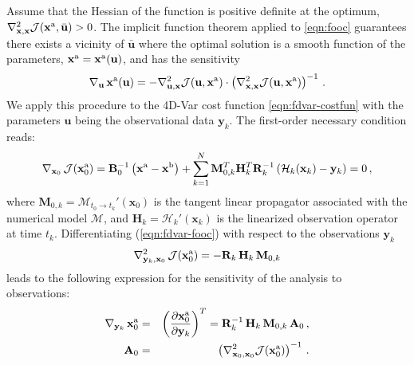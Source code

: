 \documentclass[final,sort&compress]{elsarticle}
\newcommand{\Jfunc}{\mathcal J }
\newcommand{\Model}{\mathcal M}
\newcommand{\M}{\mathbf{M}}
\newcommand{\Hobs}{\mathcal{H}}
\newcommand{\HH}{\mathbf H}
\newcommand{\A}{\mathbf{A}}
\newcommand{\B}{\mathbf{B}}
\newcommand{\R}{\mathbf{R}}
\newcommand{\x}{   \mathbf{x} }
\newcommand{\xb}{ \mathbf{x}^{\rm b} }
\newcommand{\xa}{ \mathbf{x}^{\rm a} }
\newcommand{\y}{ \mathbf{y} }
\renewcommand{\u}{ \mathbf{u} }
\begin{document}
Assume that the Hessian of the function is positive definite at the optimum, $\nabla_{\x,\x}^2 \Jfunc(\xa,\bar{\u})>0$.
The implicit function theorem applied to \eqref{eqn:fooc} guarantees there exists a vicinity of $\bar{\u}$ where the optimal solution is a smooth function
of the parameters, $\xa = \xa(\u)$, and has the sensitivity
\[
 \nabla_\u\, \xa(\u) = -\nabla_{\u,\x}^2 \Jfunc (\u, \xa) \cdot \left(\nabla_{\x,\x}^2 \Jfunc(\u, \xa)\right) ^{-1}\,. 
\]
We apply this procedure to the 4D-Var cost function \eqref{eqn:fdvar-costfun} with the parameters $\u$ being the observational data $\y_k$. The first-order necessary condition reads:
\begin{eqnarray}
\nabla_{\x_0}\, \Jfunc(\xa_0) = \B_0^{-1} \left(\xa - \xb\right) + \sum_{k=1}^{N}  \M_{0,k}^T \HH_k^T \R_k^{-1} \left( \Hobs_k(\x_k) - \y_k \right) = 0 \,,
\label{eqn:fdvar-fooc}
\end{eqnarray}
where $\M_{0,k} = \Model_{t_0 \rightarrow t_k}'(\x_0)$ is the tangent linear propagator associated with the 
numerical model $\Model$, and $\HH_k=\Hobs_k'(\x_k)$ is the linearized observation operator at time $t_k$. 
Differentiating (\ref{eqn:fdvar-fooc}) with respect to the observations $\y_k$ 
\[
\nabla_{\y_k, \x_0}^2 \, \Jfunc(\xa_0) = -\R_k \, \HH_k\, \M_{0,k}
\]
leads to the following expression for the sensitivity of the analysis to observations:
\begin{eqnarray}
\nabla_{\y_k}\, \xa_0 &=& \left( \frac{\partial \xa_0}{\partial\y_k} \right)^T = \R_k^{-1}\, \HH_k\, \M_{0,k}\, \A_0 \,,
\label{eqn:oi-matrix} \\
\A_0 &=&  \left(\nabla_{\x_0,\x_0}^2 \Jfunc(\xa_0)\right) ^{-1}\,.
\label{eqn:inverse-hessian} 
\end{eqnarray}
\end{document}
